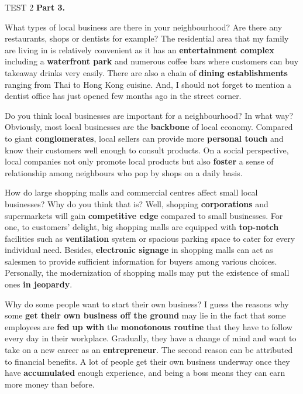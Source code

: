 \begin{glossarymc}[Cambridge 10]
\begin{test}{TEST 2}
    \noindent
    \textbf{Part 3.}
    \begin{qa}{What types of local business are there in your neighbourhood? Are there any restaurants, shops or dentists for example?}
    The residential area that my family are living in is relatively convenient as it has an \textbf{entertainment complex} including a \textbf{waterfront park} and numerous coffee bars where customers can buy takeaway drinks very easily. There are also a chain of \textbf{dining establishments} ranging from Thai to Hong Kong cuisine. And, I should not forget to mention a dentist office has just opened few months ago in the street corner.
    \end{qa}

    \begin{qa}{Do you think local businesses are important for a neighbourhood? In what way?}
    Obviously, most local businesses are the \textbf{backbone} of local economy. Compared to giant \textbf{conglomerates}, local sellers can provide more \textbf{personal touch} and know their customers well enough to consult products. On a social perspective, local companies not only promote local products but also \textbf{foster} a sense of relationship among neighbours who pop by shops on a daily basis.
    \end{qa}

    \begin{qa}{How do large shopping malls and commercial centres affect small local businesses? Why do you think that is?}
    Well, shopping \textbf{corporations} and supermarkets will gain \textbf{competitive edge} compared to small businesses. For one, to customers' delight, big shopping malls are equipped with \textbf{top-notch} facilities such as \textbf{ventilation} system or spacious parking space to cater for every individual need. Besides, \textbf{electronic signage} in shopping malls can act as salesmen to provide sufficient information for buyers among various choices. Personally, the modernization of shopping malls may put the existence of small ones \textbf{in jeopardy}.
    \end{qa}

    \begin{qa}{Why do some people want to start their own business?}
    I guess the reasons why some \textbf{get their own business off the ground} may lie in the fact that some employees are \textbf{fed up with} the \textbf{monotonous routine} that they have to follow every day in their workplace. Gradually, they have a change of mind and want to take on a new career as an \textbf{entrepreneur}. The second reason can be attributed to financial benefits. A lot of people get their own business underway once they have \textbf{accumulated} enough experience, and being a boss means they can earn more money than before.
    \end{qa}


\end{test}
\end{glossarymc}
